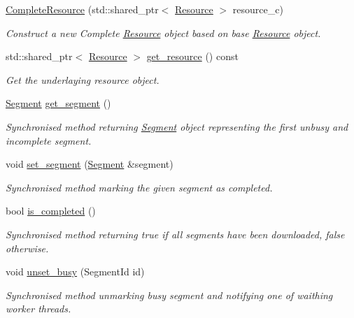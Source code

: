 \begin{DoxyCompactItemize}
\item 
\hyperlink{classsimpleP2P_1_1CompleteResource_a758df5fa183938450b71d1e36af8fbaf}{Complete\+Resource} (std\+::shared\+\_\+ptr$<$ \hyperlink{classsimpleP2P_1_1Resource}{Resource} $>$ resource\+\_\+c)
\begin{DoxyCompactList}\small\item\em Construct a new Complete \hyperlink{classsimpleP2P_1_1Resource}{Resource} object based on base \hyperlink{classsimpleP2P_1_1Resource}{Resource} object. \end{DoxyCompactList}\item 
std\+::shared\+\_\+ptr$<$ \hyperlink{classsimpleP2P_1_1Resource}{Resource} $>$ \hyperlink{classsimpleP2P_1_1CompleteResource_ac31825cc3bed61d181456430db3878f4}{get\+\_\+resource} () const
\begin{DoxyCompactList}\small\item\em Get the underlaying resource object. \end{DoxyCompactList}\item 
\hyperlink{classsimpleP2P_1_1Segment}{Segment} \hyperlink{classsimpleP2P_1_1CompleteResource_aabe86fbdc8daab23c1df0bc2abb91e7d}{get\+\_\+segment} ()
\begin{DoxyCompactList}\small\item\em Synchronised method returning \hyperlink{classsimpleP2P_1_1Segment}{Segment} object representing the first unbusy and incomplete segment. \end{DoxyCompactList}\item 
void \hyperlink{classsimpleP2P_1_1CompleteResource_a52ddae2486fb593cc315247af38014e7}{set\+\_\+segment} (\hyperlink{classsimpleP2P_1_1Segment}{Segment} \&segment)
\begin{DoxyCompactList}\small\item\em Synchronised method marking the given segment as completed. \end{DoxyCompactList}\item 
bool \hyperlink{classsimpleP2P_1_1CompleteResource_aaa20fce1d1d3fbd3f616debaedcaf7a3}{is\+\_\+completed} ()
\begin{DoxyCompactList}\small\item\em Synchronised method returning true if all segments have been downloaded, false otherwise. \end{DoxyCompactList}\item 
void \hyperlink{classsimpleP2P_1_1CompleteResource_af2dd5d30d807b11ecdad7feaf488df89}{unset\+\_\+busy} (Segment\+Id id)
\begin{DoxyCompactList}\small\item\em Synchronised method unmarking busy segment and notifying one of waithing worker threads. \end{DoxyCompactList}\end{DoxyCompactItemize}


